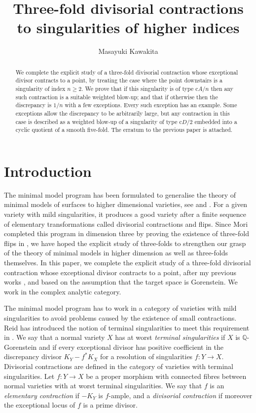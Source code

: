 \documentclass[a4paper,11pt]{amsart}
\title[Three-fold divisorial contractions]
{Three-fold divisorial contractions to singularities of higher indices}
\author{Masayuki Kawakita}
\theoremstyle{definition}
\theoremstyle{remark}
\numberwithin{equation}{section}
\newcommand{\bQ}{{\mathbb Q}}
\begin{document}
\maketitle

\begin{abstract}
We complete the explicit study of a three-fold divisorial contraction
whose exceptional divisor contracts to a point,
by treating the case where
the point downstairs is a singularity of index $n \ge 2$.
We prove that if this singularity is of type c$A/n$
then any such contraction is a suitable weighted blow-up;
and that if otherwise then the discrepancy is $1/n$ with a few exceptions.
Every such exception has an example.
Some exceptions allow the discrepancy to be arbitrarily large,
but any contraction in this case is described as
a weighted blow-up of a singularity of type c$D/2$
embedded into a cyclic quotient of a smooth five-fold.
The erratum to the previous paper \cite{Ka03} is attached.
\end{abstract}

\tableofcontents

\section{Introduction}\label{sec:introduction}
The minimal model program has been formulated to generalise the theory of
minimal models of surfaces to higher dimensional varieties,
see \cite{KMM87} and \cite{KM98}.
For a given variety with mild singularities,
it produces a good variety
after a finite sequence of elementary transformations
called divisorial contractions and flips.
Since Mori completed this program in dimension three
by proving the existence of three-fold flips in \cite{Mo88},
we have hoped the explicit study of three-folds
to strengthen our grasp of the theory of minimal models in higher dimension
as well as three-folds themselves.
In this paper,
we complete the explicit study of a three-fold divisorial contraction
whose exceptional divisor contracts to a point,
after my previous works \cite{Ka01}, \cite{Ka02} and \cite{Ka03}
based on the assumption that the target space is Gorenstein.
We work in the complex analytic category.

The minimal model program has to work
in a category of varieties with mild singularities
to avoid problems caused by the existence of small contractions.
Reid has introduced the notion of terminal singularities
to meet this requirement in \cite{Re83}.
We say that a normal variety $X$ has at worst \textit{terminal singularities}
if $X$ is $\bQ$-Gorenstein and
if every exceptional divisor has positive coefficient
in the discrepancy divisor $K_Y-f^*K_X$
for a resolution of singularities $f \colon Y \to X$.
Divisorial contractions are defined
in the category of varieties with terminal singularities.
Let $f \colon Y \to X$ be a proper morphism with connected fibres
between normal varieties with at worst terminal singularities.
We say that $f$ is an \textit{elementary contraction} if $-K_Y$ is $f$-ample,
and a \textit{divisorial contraction}
if moreover the exceptional locus of $f$ is a prime divisor.
\end{document}
